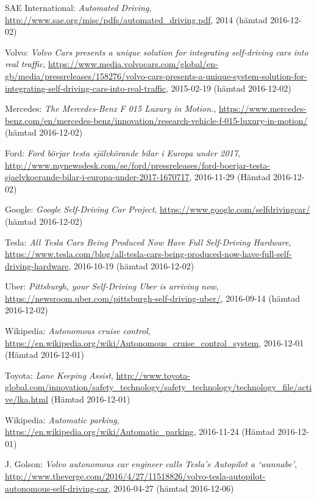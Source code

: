 \documentclass[a4paper]{IEEEtran}
\begin{document}
\begin{thebibliography}{77}
	SAE International: \emph{Automated Driving}, 
	\url{http://www.sae.org/misc/pdfs/automated_driving.pdf}, 
	2014 (hämtad 2016-12-02)
	
	Volvo: \emph{Volvo Cars presents a unique solution for integrating self-driving cars into real traffic}, 
	\url{https://www.media.volvocars.com/global/en-gb/media/pressreleases/158276/volvo-cars-presents-a-unique-system-solution-for-integrating-self-driving-cars-into-real-traffic}, 
	2015-02-19 (hämtad 2016-12-02)
	
	Mercedes: \emph{The Mercedes-Benz F 015 Luxury in Motion.}, 
	\url{https://www.mercedes-benz.com/en/mercedes-benz/innovation/research-vehicle-f-015-luxury-in-motion/}
	(hämtad 2016-12-02)
	
	Ford: \emph{Ford börjar testa självkörande bilar i Europa under 2017}, 
	\url{http://www.mynewsdesk.com/se/ford/pressreleases/ford-boerjar-testa-sjaelvkoerande-bilar-i-europa-under-2017-1670717}, 
	2016-11-29 (Hämtad 2016-12-02)
	
	Google: \emph{Google Self-Driving Car Project}, 
	\url{https://www.google.com/selfdrivingcar/} 
	(hämtad 2016-12-02)
	
	Tesla: \emph{All Tesla Cars Being Produced Now Have Full Self-Driving Hardware}, 
	\url{https://www.tesla.com/blog/all-tesla-cars-being-produced-now-have-full-self-driving-hardware}, 
	2016-10-19 (hämtad 2016-12-02)
	
	Uber: \emph{Pittsburgh, your Self-Driving Uber is arriving now}, 
	\url{https://newsroom.uber.com/pittsburgh-self-driving-uber/}, 
	2016-09-14 (hämtad 2016-12-02)
	
	Wikipedia: \emph{Autonomous cruise control}, 
	\url{https://en.wikipedia.org/wiki/Autonomous_cruise_control_system}, 
	2016-12-01 (Hämtad 2016-12-01)
	
	Toyota: \emph{Lane Keeping Assist}, 
	\url{http://www.toyota-global.com/innovation/safety_technology/safety_technology/technology_file/active/lka.html}
	(Hämtad 2016-12-01)
	
	Wikipedia: \emph{Automatic parking}, 
	\url{https://en.wikipedia.org/wiki/Automatic_parking}, 
	2016-11-24 (Hämtad 2016-12-01)
	
	J. Golson: \emph{Volvo autonomous car engineer calls Tesla’s Autopilot a ‘wannabe'},
	\url{http://www.theverge.com/2016/4/27/11518826/volvo-tesla-autopilot-autonomous-self-driving-car},
	2016-04-27 (hämtad 2016-12-06)
	

\end{thebibliography}
\end{document}
